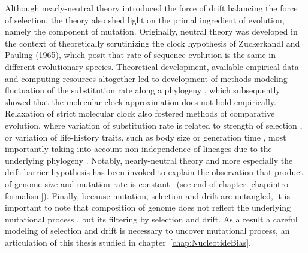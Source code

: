 Although nearly-neutral theory introduced the force of drift balancing the force of selection, the theory also shed light on the primal ingredient of evolution, namely the component of mutation.
Originally, neutral theory was developed in the context of theoretically scrutinizing the clock hypothesis of Zuckerkandl and Pauling (1965), which posit that rate of sequence evolution is the same in different evolutionary species.
Theoretical development, available empirical data and computing resources altogether led to development of methods modeling fluctuation of the substitution rate along a phylogeny \citep{Thorne1998}, which subsequently showed that the molecular clock approximation does not hold empirically.
Relaxation of strict molecular clock also fostered methods of comparative evolution, where variation of substitution rate is related to strength of selection \citep{Seo2004}, or variation of life-history traits, such as body size or generation time \citep{Lartillot2012}, most importantly taking into account non-independence of lineages due to the underlying phylogeny \citep{Lanfear2010a}.
Notably, nearly-neutral theory and more especially the drift barrier hypothesis has been invoked to explain the observation that product of genome size and mutation rate is constant~\citep{Lynch2016a} (see end of chapter \ref{chap:intro-formalism}).
Finally, because mutation, selection and drift are untangled, it is important to note that composition of genome does not reflect the underlying mutational process \citep{Singer2000}, but its filtering by selection and drift.
As a result a careful modeling of selection and drift is necessary to uncover mutational process, an articulation of this thesis studied in chapter~\ref{chap:NucleotideBias}.

